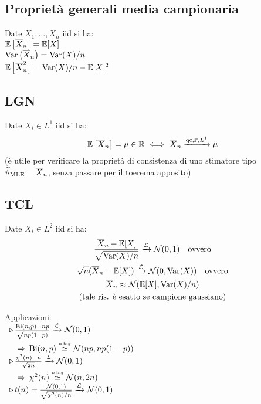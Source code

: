 \subsection{Proprietà generali media campionaria}

Date $X_1,\ldots,X_n$ iid si ha: \\
$\mathbb{E}\left[\overline{X}_n\right]=\mathbb{E}[X]$ \\
$\operatorname{Var}\left(\overline{X}_n\right)=\operatorname{Var}(X)/n$ \\
$\mathbb{E}\left[\overline{X}_n^2\right]=\operatorname{Var}(X)/n-\mathbb{E}[X]^2$

\subsection{LGN}

Date $X_i\in L^1$ iid si ha:
\begin{equation*}
\EE\left[\Xn\right]=\mu\in\RR\ \Longleftrightarrow\ \Xn\xrightarrow{\text{qc},\PP,L^1}\mu
\end{equation*}
(è utile per verificare la proprietà di consistenza di uno stimatore tipo $\widehat{\vartheta}_{\text{MLE}}=\overline{X}_n$, senza passare per il toerema apposito)

\subsection{TCL}

Date $X_i\in L^2$ iid si ha:
\begin{gather*}
\frac{\overline{X}_n-\mathbb{E}[X]}{\sqrt{\operatorname{Var}(X)/n}}\xrightarrow{\mathcal{L}}\mathcal{N}(0,1) \quad \text{ovvero}\\
\sqrt{n}(\overline{X}_n-\mathbb{E}[X])\xrightarrow{\mathcal{L}}\mathcal{N}(0,\operatorname{Var}(X))\quad\text{ovvero} \\
\overline{X}_n\approx \mathcal{N}(\mathbb{E}[X],\operatorname{Var}(X)/n) \\
(\text{tale ris. è esatto se campione gaussiano})
\end{gather*}

Applicazioni:\\
$\begin{array}{l}
\triangleright\,\frac{\text{Bi}(n,p)-np}{\sqrt{np(1-p)}}\xrightarrow{\mathcal{L}} \mathcal{N} (0,1) \\
\quad \Rightarrow\, \text{Bi}(n,p)\overset{\underset{n\,\text{big}}{}}{\simeq}\mathcal{N}(np,np(1-p)) \\
\triangleright\,\frac{\chi^2(n)-n}{\sqrt{2n}}\xrightarrow{\mathcal{L}} \mathcal{N} (0,1) \\
\quad \Rightarrow\,\chi^2(n)\overset{\underset{n\,\text{big}}{}}{\simeq}\mathcal{N}(n,2n) \\
\triangleright\,t(n)=\frac{\mathcal{N}(0,1)}{\sqrt{\chi^2(n)/n}}\xrightarrow{\mathcal{L}} \mathcal{N} (0,1)
\end{array}$


